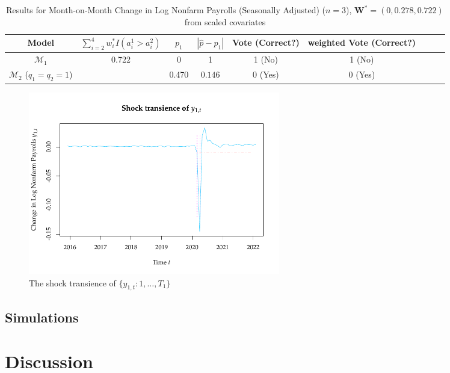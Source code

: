 \documentclass[11pt]{article}
\def\mbf#1{\mathbf{#1}} %
\def\mc#1{\mathcal{#1}} %
\def\mc#1{\mathcal{#1}}
\theoremstyle{definition}
\begin{document}
\begin{table}[H]
	\caption{Results for Month-on-Month Change in Log Nonfarm Payrolls (Seasonally Adjusted) ($n=3$), $\mbf{W}^* = (0, 0.278, 0.722)$ from scaled covariates} \label{uemtable}
\begin{center}
  \begin{tabular}{ccccccccr}
      Model & $\sum_{i=2}^4 w_i^* I(a_i^1 > a_i^2)$  & $p_1$ &  $|\hat{p}-p_1|$ & Vote (Correct?) & weighted Vote (Correct?)   \\
     \hline 
     $\mc{M}_1$  & \multirow{2}{*}{0.722}& 0  & 1 & 1 (No) &1 (No)  \\      
      $\mc{M}_2$ ($q_1=q_2=1$)  & & 0.470 & $0.146$   & 0 (Yes) &0 (Yes)   \\[.2cm]
  \end{tabular}
\end{center}	
\end{table}


\begin{figure}[H]
	\begin{center}
		\includegraphics[height = 8cm]{UEMtransience.pdf}
		\caption{The shock transience of $\{y_{1,t} \colon 1, \ldots, T_1\}$} \label{uemshocktransience}
	\end{center}	
\end{figure}



\subsection{Simulations}
\label{simulation}




\section{Discussion}
\end{document}

